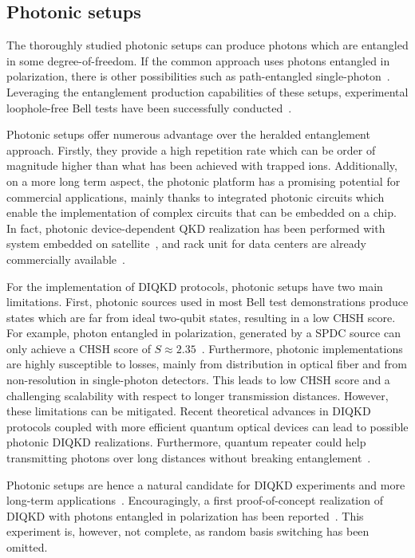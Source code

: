 \subsection{Photonic setups}

The thoroughly studied photonic setups can produce photons which are entangled in some degree-of-freedom.
If the common approach uses photons entangled in polarization, there is other possibilities such as path-entangled single-photon~\cite{Caspar2020}.
Leveraging the entanglement production capabilities of these setups, experimental loophole-free Bell tests have been successfully conducted~\cite{Giustina2015,Shalm2015,Li2018}.

Photonic setups offer numerous advantage over the heralded entanglement approach.
Firstly, they provide a high repetition rate which can be order of magnitude higher than what has been achieved with trapped ions.
Additionally, on a more long term aspect, the photonic platform has a promising potential for commercial applications, mainly thanks to integrated photonic circuits which enable the implementation of complex circuits that can be embedded on a chip.
In fact, photonic device-dependent QKD realization has been performed with system embedded on satellite~\cite{Liao2017}, and rack unit for data centers are already commercially available~\cite{Pljonkin2018}. 

For the implementation of DIQKD protocols, photonic setups have two main limitations.
First, photonic sources used in most Bell test demonstrations produce states which are far from ideal two-qubit states, resulting in a low CHSH score.
For example, photon entangled in polarization, generated by a SPDC source can only achieve a CHSH score of $S\approx 2.35$~\cite{Vivoli2015b}.
Furthermore, photonic implementations are highly susceptible to losses, mainly from distribution in optical fiber and from non-resolution in single-photon detectors.
This leads to low CHSH score and a challenging scalability with respect to longer transmission distances.
However, these limitations can be mitigated.
Recent theoretical advances in DIQKD protocols coupled with more efficient quantum optical devices can lead to possible photonic DIQKD realizations.
Furthermore, quantum repeater could help transmitting photons over long distances without breaking entanglement~\cite{Sangouard2011}.

\medbreak

Photonic setups are hence a natural candidate for DIQKD experiments and more long-term applications~\cite{Zapatero2023}.
Encouragingly, a first proof-of-concept realization of DIQKD with photons entangled in polarization has been reported~\cite{Liu2022}.
This experiment is, however, not complete, as random basis switching has been omitted.

